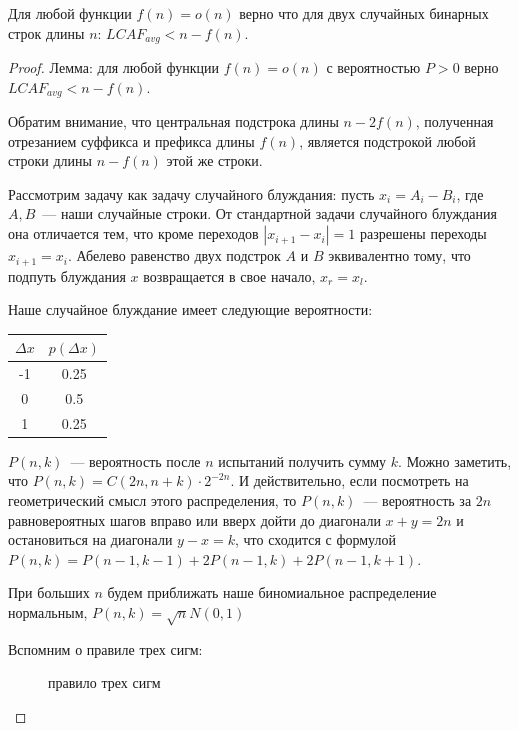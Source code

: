 \begin{theorem} %
Для любой функции $f(n)=o(n)$ верно что для двух случайных бинарных строк длины $n$: $LCAF_{avg} < n - f(n)$.
\end{theorem}
\begin{proof}

Лемма: для любой функции $f(n)=o(n)$ с вероятностью $P>0$ верно $LCAF_{avg} < n - f(n)$.

Обратим внимание, что центральная подстрока длины $n-2f(n)$, полученная отрезанием суффикса и префикса длины $f(n)$, является подстрокой любой строки длины $n-f(n)$ этой же строки.

Рассмотрим задачу как задачу случайного блуждания: пусть $x_i = A_i - B_i$, где $A, B$~--- наши случайные строки. От стандартной задачи случайного блуждания она отличается тем, что кроме переходов $|x_{i+1}-x_i|=1$ разрешены переходы $x_{i+1}=x_i$. Абелево равенство двух подстрок $A$ и $B$ эквивалентно тому, что подпуть блуждания $x$ возвращается в свое начало, $x_r=x_l$.

Наше случайное блуждание имеет следующие вероятности:

\begin{tabular}{|c|c|}
\hline
$\Delta x$ & $p(\Delta x)$ \\
\hline
-1 & 0.25 \\
\hline
0 & 0.5 \\
\hline
1 & 0.25 \\
\hline
\end{tabular}

$P(n, k)$~--- вероятность после $n$ испытаний получить сумму $k$. Можно заметить, что $P(n, k)=C(2n, n+k)\cdot 2^{-2n}$. И действительно, если посмотреть на геометрический смысл этого распределения, то $P(n,k)$~--- вероятность за $2n$ равновероятных шагов вправо или вверх дойти до диагонали $x+y=2n$ и остановиться на диагонали $y-x=k$, что сходится с формулой $P(n,k)=P(n-1,k-1)+2P(n-1,k)+2P(n-1,k+1)$.

При больших $n$ будем приближать наше биномиальное распределение нормальным, $P(n, k)=\sqrt {n} N(0,1)$ %

Вспомним о правиле трех сигм:

\begin{figure}[h]
\caption{правило трех сигм \cite{3}}
\end{figure}


\end{proof}
